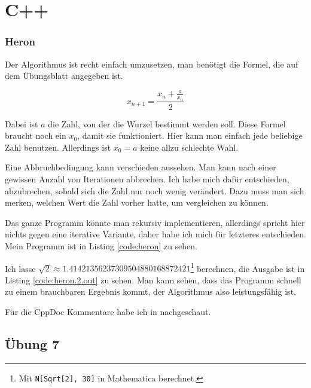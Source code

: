 
\part{C++}

\section{Heron}

Der Algorithmus ist recht einfach umzusetzen, man benötigt die Formel, die auf dem Übungsblatt angegeben ist.

\begin{equation}
x_{n+1}=\frac{x_n+\frac{a}{x_n}}{2}
\end{equation}

Dabei ist $a$ die Zahl, von der die Wurzel bestimmt werden soll. Diese Formel braucht noch ein $x_0$, damit sie funktioniert. Hier kann man einfach jede beliebige Zahl benutzen. Allerdings ist $x_0=a$ keine allzu schlechte Wahl.

Eine Abbruchbedingung kann verschieden aussehen. Man kann nach einer gewissen Anzahl von Iterationen abbrechen. Ich habe mich dafür entschieden, abzubrechen, sobald sich die Zahl nur noch wenig verändert. Dazu muss man sich merken, welchen Wert die Zahl vorher hatte, um vergleichen zu können.

Das ganze Programm könnte man rekursiv implementieren, allerdings spricht hier nichts gegen eine iterative Variante, daher habe ich mich für letzteres entschieden. Mein Programm ist in Listing \ref{code:heron} zu sehen.


Ich lasse $\sqrt{2} \approx 1.41421356237309504880168872421$\footnote{Mit \texttt{N[Sqrt[2], 30]} in Mathematica berechnet.} berechnen, die Ausgabe ist in Listing \ref{code:heron.2.out} zu sehen. Man kann sehen, dass das Programm schnell zu einem brauchbaren Ergebnis kommt, der Algorithmus also leistungsfähig ist.


Für die CppDoc Kommentare habe ich in \cite{cppdoc} nachgeschaut.

\chapter{Übung 7}

